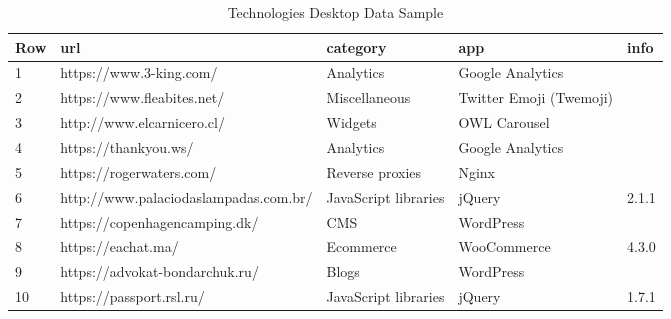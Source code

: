 \begin{enumerate}
	\begin{table}[H]
		\centering
		\begin{tabular}{|l|l|p{3cm}|p{3cm}|l|}
			\hline
			\textbf{Row} & \textbf{url} & \textbf{category} & app & info\\
			\hline
			1 & https://www.3-king.com/ & Analytics & Google Analytics & \\
			\hline
			2 & https://www.fleabites.net/ & Miscellaneous & Twitter Emoji (Twemoji) & \\
			\hline
			3 & http://www.elcarnicero.cl/ & Widgets & OWL Carousel & \\
			\hline
			4 & https://thankyou.ws/ & Analytics & Google Analytics & \\
			\hline
			5 & https://rogerwaters.com/ & Reverse proxies & Nginx & \\
			\hline
			6 & http://www.palaciodaslampadas.com.br/ & JavaScript libraries & jQuery & 2.1.1\\
			\hline
			7 & https://copenhagencamping.dk/ & CMS & WordPress & \\
			\hline
			8 & https://eachat.ma/ & Ecommerce & WooCommerce & 4.3.0\\
			\hline
			9 & https://advokat-bondarchuk.ru/ & Blogs & WordPress & \\
			\hline
			10 & https://passport.rsl.ru/ & JavaScript libraries & jQuery & 1.7.1\\
			\hline
		\end{tabular}
		\caption{Technologies Desktop Data Sample}
		\label{table:ct_tech_desktop}
	\end{table}
	

\end{enumerate}
